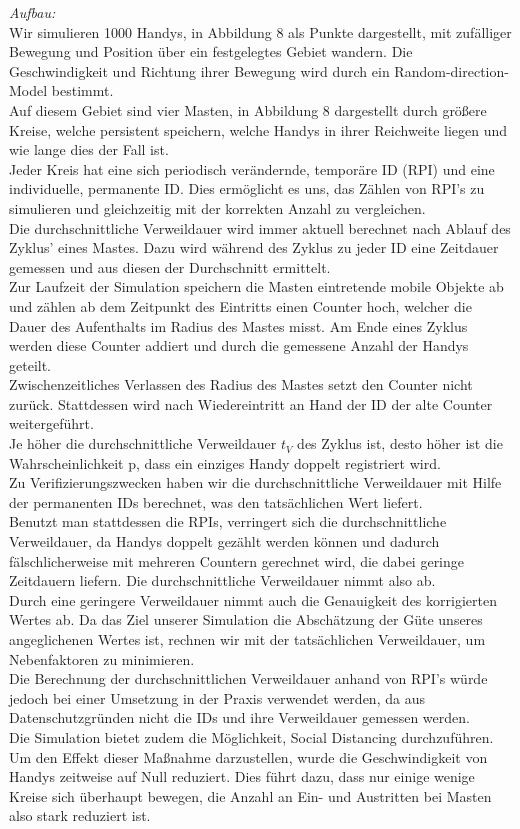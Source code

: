 \documentclass[conference]{IEEEtran}
\begin{document}
\textit{Aufbau:}\\
Wir simulieren 1000 Handys, in Abbildung 8 als Punkte dargestellt, mit zufälliger Bewegung und Position über ein festgelegtes Gebiet wandern. Die Geschwindigkeit und Richtung ihrer Bewegung wird durch ein Random-direction-Model bestimmt.\\
Auf diesem Gebiet sind vier Masten, in Abbildung 8 dargestellt durch größere Kreise, welche persistent speichern, welche Handys in ihrer Reichweite liegen und wie lange dies der Fall ist.\\
Jeder Kreis hat eine sich periodisch verändernde, temporäre ID (RPI) und eine individuelle, permanente ID. Dies ermöglicht es uns, das Zählen von RPI’s zu simulieren und gleichzeitig mit der korrekten Anzahl zu vergleichen.\\
Die durchschnittliche Verweildauer wird immer aktuell berechnet nach Ablauf des Zyklus' eines Mastes. Dazu wird während des Zyklus zu jeder ID eine Zeitdauer gemessen und aus diesen der Durchschnitt ermittelt.\\
Zur Laufzeit der Simulation speichern die Masten eintretende mobile Objekte ab und zählen ab dem Zeitpunkt des Eintritts einen Counter hoch, welcher die Dauer des Aufenthalts im Radius des Mastes misst. Am Ende eines Zyklus werden diese Counter addiert und durch die gemessene Anzahl der Handys geteilt.\\
Zwischenzeitliches Verlassen des Radius des Mastes setzt den Counter nicht zurück. Stattdessen wird nach Wiedereintritt an Hand der ID der alte Counter weitergeführt.\\
Je höher die durchschnittliche Verweildauer $t_V$ des Zyklus ist, desto höher ist die Wahrscheinlichkeit p, dass ein einziges Handy doppelt registriert wird.\\
Zu Verifizierungszwecken haben wir die durchschnittliche Verweildauer mit Hilfe der permanenten IDs berechnet, was den tatsächlichen Wert liefert.\\
Benutzt man stattdessen die RPIs, verringert sich die durchschnittliche Verweildauer, da Handys doppelt gezählt werden können und dadurch fälschlicherweise mit mehreren Countern gerechnet wird, die dabei geringe Zeitdauern liefern. Die durchschnittliche Verweildauer nimmt also ab.\\
Durch eine geringere Verweildauer nimmt auch die Genauigkeit des korrigierten Wertes ab. Da das Ziel unserer Simulation die Abschätzung der Güte unseres angeglichenen Wertes ist, rechnen wir mit der tatsächlichen Verweildauer, um Nebenfaktoren zu minimieren.\\ 
Die Berechnung der durchschnittlichen Verweildauer anhand von RPI's würde jedoch bei einer Umsetzung in der Praxis verwendet werden, da aus Datenschutzgründen nicht die IDs und ihre Verweildauer gemessen werden.\\
Die Simulation bietet zudem die Möglichkeit, Social Distancing durchzuführen. Um den Effekt dieser Maßnahme darzustellen, wurde die Geschwindigkeit von Handys zeitweise auf Null reduziert. Dies führt dazu, dass nur einige wenige Kreise sich überhaupt bewegen, die Anzahl an Ein- und Austritten bei Masten also stark reduziert ist.\\
\end{document}
